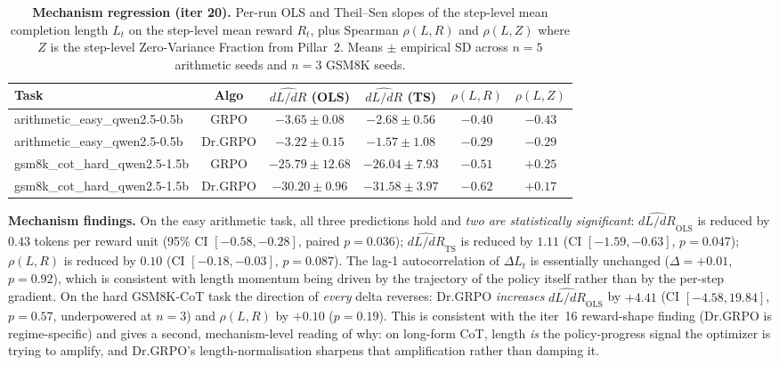 \begin{table}[htbp]
\centering\small
\begin{tabular}{l c c c c c}
\hline
\textbf{Task} & \textbf{Algo} & \textbf{$\widehat{dL/dR}$ (OLS)} & \textbf{$\widehat{dL/dR}$ (TS)} & \textbf{$\rho(L,R)$} & \textbf{$\rho(L,Z)$} \\
\hline
arithmetic\_easy\_qwen2.5-0.5b & GRPO    & $-3.65 \pm 0.08$ & $-2.68 \pm 0.56$ & $-0.40$ & $-0.43$ \\
arithmetic\_easy\_qwen2.5-0.5b & Dr.GRPO & $-3.22 \pm 0.15$ & $-1.57 \pm 1.08$ & $-0.29$ & $-0.29$ \\
\hline
gsm8k\_cot\_hard\_qwen2.5-1.5b  & GRPO    & $-25.79 \pm 12.68$ & $-26.04 \pm 7.93$ & $-0.51$ & $+0.25$ \\
gsm8k\_cot\_hard\_qwen2.5-1.5b  & Dr.GRPO & $-30.20 \pm 0.96$  & $-31.58 \pm 3.97$ & $-0.62$ & $+0.17$ \\
\hline
\end{tabular}
\caption{\textbf{Mechanism regression (iter 20).} Per-run OLS and
Theil--Sen slopes of the step-level mean completion length $L_t$ on the
step-level mean reward $R_t$, plus Spearman $\rho(L, R)$ and $\rho(L, Z)$
where $Z$ is the step-level Zero-Variance Fraction from Pillar~2.
Means $\pm$ empirical SD across $n{=}5$ arithmetic seeds and $n{=}3$
GSM8K seeds.}
\label{tab:mechanism}
\end{table}

\textbf{Mechanism findings.} On the easy arithmetic task, all three
predictions hold and \emph{two are statistically significant}:
$\widehat{dL/dR}_{\text{OLS}}$ is reduced by $0.43$ tokens per reward
unit (95\% CI $[-0.58, -0.28]$, paired $p{=}0.036$);
$\widehat{dL/dR}_{\text{TS}}$ is reduced by $1.11$ (CI $[-1.59, -0.63]$,
$p{=}0.047$); $\rho(L,R)$ is reduced by $0.10$ (CI $[-0.18, -0.03]$,
$p{=}0.087$). The lag-1 autocorrelation of $\Delta L_t$ is essentially
unchanged ($\Delta = +0.01$, $p{=}0.92$), which is consistent with
length momentum being driven by the trajectory of the policy itself
rather than by the per-step gradient. On the hard GSM8K-CoT task the
direction of \emph{every} delta reverses: Dr.GRPO \emph{increases}
$\widehat{dL/dR}_{\text{OLS}}$ by $+4.41$ (CI $[-4.58, 19.84]$,
$p{=}0.57$, underpowered at $n{=}3$) and $\rho(L,R)$ by $+0.10$
($p{=}0.19$). This is consistent with the iter~16 reward-shape finding
(Dr.GRPO is regime-specific) and gives a second, mechanism-level reading
of why: on long-form CoT, length \emph{is} the policy-progress signal
the optimizer is trying to amplify, and Dr.GRPO's length-normalisation
sharpens that amplification rather than damping it.

